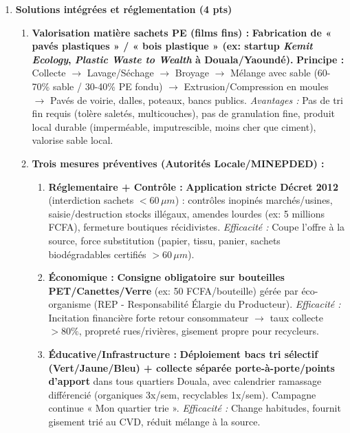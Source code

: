 \documentclass[11pt]{article}
\begin{document}
\begin{corrige}
\begin{enumerate}
\begin{enumerate}
\begin{itemize}
            \item Homme (consommateur final poisson \emph{Silure}, \emph{Barbus}) $\rightarrow$ exposition chronique faibles doses $\rightarrow$ perturbation système endocrinien (œstrogénique, anti-androgénique) $\rightarrow$ infertilité, malformations génitales, puberté précoce, cancers hormone-dépendants, troubles métaboliques (diabète, obésité). Risque accru fœtus/enfants.
        \end{itemize}
    \end{enumerate}

    \item \textbf{Solutions intégrées et réglementation (4 pts)}
    \begin{enumerate}
        \item \textbf{Valorisation matière sachets PE (films fins) :} \textbf{Fabrication de « pavés plastiques » / « bois plastique » (ex: startup \textit{Kemit Ecology}, \textit{Plastic Waste to Wealth} à Douala/Yaoundé).}
        \textbf{Principe :} Collecte $\rightarrow$ Lavage/Séchage $\rightarrow$ Broyage $\rightarrow$ Mélange avec sable (60-70\% sable / 30-40\% PE fondu) $\rightarrow$ Extrusion/Compression en moules $\rightarrow$ Pavés de voirie, dalles, poteaux, bancs publics. 
        \textit{Avantages :} Pas de tri fin requis (tolère saletés, multicouches), pas de granulation fine, produit local durable (imperméable, imputrescible, moins cher que ciment), valorise sable local.
        \item \textbf{Trois mesures préventives (Autorités Locale/MINEPDED) :}
        \begin{enumerate}
            \item \textbf{Réglementaire + Contrôle :} \textbf{Application stricte Décret 2012} (interdiction sachets $<60\,\mu m$) : contrôles inopinés marchés/usines, saisie/destruction stocks illégaux, amendes lourdes (ex: 5 millions FCFA), fermeture boutiques récidivistes. \textit{Efficacité :} Coupe l'offre à la source, force substitution (papier, tissu, panier, sachets biodégradables certifiés $>60\,\mu m$).
            \item \textbf{Économique :} \textbf{Consigne obligatoire sur bouteilles PET/Canettes/Verre} (ex: 50 FCFA/bouteille) gérée par éco-organisme (REP - Responsabilité Élargie du Producteur). \textit{Efficacité :} Incitation financière forte retour consommateur $\rightarrow$ taux collecte $>80\%$, propreté rues/rivières, gisement propre pour recycleurs.
            \item \textbf{Éducative/Infrastructure :} \textbf{Déploiement bacs tri sélectif (Vert/Jaune/Bleu) + collecte séparée porte-à-porte/points d'apport} dans tous quartiers Douala, avec calendrier ramassage différencié (organiques 3x/sem, recyclables 1x/sem). Campagne continue « Mon quartier trie ». \textit{Efficacité :} Change habitudes, fournit gisement trié au CVD, réduit mélange à la source.

\end{enumerate}
\end{enumerate}
\end{enumerate}
\end{corrige}
\end{document}
